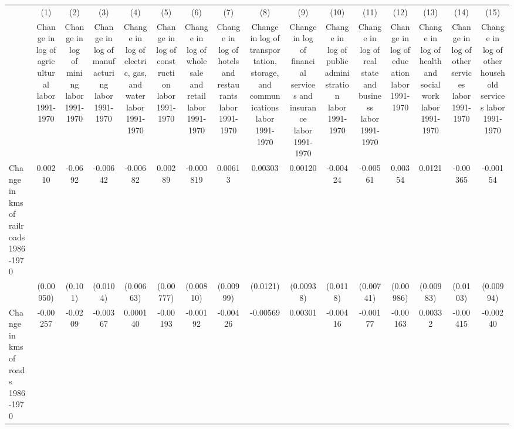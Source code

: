 {
\def\sym#1{\ifmmode^{#1}\else\(^{#1}\)\fi}
\begin{tabular}{l*{15}{c}}
\hline\hline
                &\multicolumn{1}{c}{(1)}&\multicolumn{1}{c}{(2)}&\multicolumn{1}{c}{(3)}&\multicolumn{1}{c}{(4)}&\multicolumn{1}{c}{(5)}&\multicolumn{1}{c}{(6)}&\multicolumn{1}{c}{(7)}&\multicolumn{1}{c}{(8)}&\multicolumn{1}{c}{(9)}&\multicolumn{1}{c}{(10)}&\multicolumn{1}{c}{(11)}&\multicolumn{1}{c}{(12)}&\multicolumn{1}{c}{(13)}&\multicolumn{1}{c}{(14)}&\multicolumn{1}{c}{(15)}\\
                &\multicolumn{1}{c}{Change in log of agricultural labor 1991-1970}&\multicolumn{1}{c}{Change in log of mining labor 1991-1970}&\multicolumn{1}{c}{Change in log of manufacturing labor 1991-1970}&\multicolumn{1}{c}{Change in log of electric, gas, and water labor 1991-1970}&\multicolumn{1}{c}{Change in log of construction labor 1991-1970}&\multicolumn{1}{c}{Change in log of wholesale and retail labor 1991-1970}&\multicolumn{1}{c}{Change in log of hotels and restaurants labor 1991-1970}&\multicolumn{1}{c}{Change in log of transportation, storage, and communications labor 1991-1970}&\multicolumn{1}{c}{Change in log of financial services and insurance labor 1991-1970}&\multicolumn{1}{c}{Change in log of public administration labor 1991-1970}&\multicolumn{1}{c}{Change in log of real state and business labor 1991-1970}&\multicolumn{1}{c}{Change in log of education labor 1991-1970}&\multicolumn{1}{c}{Change in log of health and social work labor 1991-1970}&\multicolumn{1}{c}{Change in log of other services labor 1991-1970}&\multicolumn{1}{c}{Change in log of other household services labor 1991-1970}\\
\hline
Change in kms of railroads 1986-1970&  0.00210         &  -0.0692         & -0.00642         & -0.00682         &  0.00289         &-0.000819         &  0.00613         &  0.00303         &  0.00120         & -0.00424         & -0.00561         &  0.00354         &   0.0121         & -0.00365         & -0.00154         \\
                &(0.00950)         &  (0.101)         & (0.0104)         &(0.00663)         &(0.00777)         &(0.00810)         &(0.00999)         & (0.0121)         &(0.00938)         & (0.0118)         &(0.00741)         &(0.00986)         &(0.00983)         & (0.0103)         &(0.00994)         \\
[1em]
Change in kms of roads 1986-1970& -0.00257         &  -0.0209         & -0.00367         & 0.000140         & -0.00193         & -0.00192         & -0.00426         & -0.00569         &  0.00301         & -0.00416         & -0.00177         & -0.00163         &  0.00332         & -0.00415         & -0.00240         \\

\end{tabular}}
